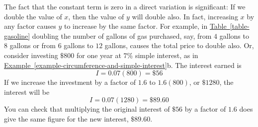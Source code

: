 \documentclass[10pt,]{book}
\theoremstyle{plain}
\theoremstyle{definition}
\theoremstyle{definition}
\theoremstyle{definition}
\theoremstyle{definition}
\theoremstyle{definition}
\numberwithin{equation}{section}
\begin{document}
	The fact that the constant term is zero in a direct variation is significant: If we double the value of \(x\), then the value of \(y\) will double also. In fact, increasing \(x\) by any factor causes \(y\) to increase by the same factor. For example, in \hyperref[table-gasoline]{Table~\ref{table-gasoline}} doubling the number of gallons of gas purchased, say, from \(4\) gallons to \(8\) gallons or from \(6\) gallons to \(12\) gallons, causes the total price to double also. Or, consider investing \(\$800\) for one year at \(7\)\% simple interest, as in \hyperref[example-circumference-and-simple-interest]{Example~\ref{example-circumference-and-simple-interest}}b. The interest earned is
	\begin{equation*}I = 0.07(800) = \$56\end{equation*}
	If we increase the investment by a factor of \(1.6\) to \(1.6 (800)\), or \(\$1280\), the interest will be 
	\begin{equation*}I = 0.07(1280) = \$89.60\end{equation*}
	You can check that multiplying the original interest of \(\$56\) by a factor of \(1.6\) does give the same figure for the new interest, \(\$89.60\).
%
\end{document}
